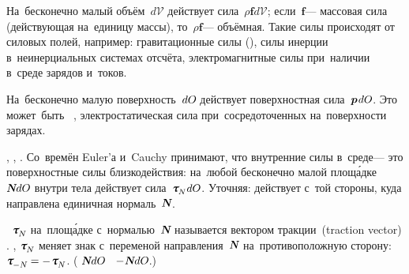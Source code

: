 \begin{otherlanguage}{russian}

На~бесконечно малый объём~$d\mathcal{V}$ действует сила~${\rho \bm{f} d\mathcal{V}}$; \hbox{если}~$\bm{f}$\:--- массовая сила (действующая на~единицу массы), то~${\rho \bm{f}}$\:--- объёмная. Такие силы происходят от силовых полей, например: гравитационные силы (), силы инерции в~неинерциальных системах отсчёта, электромагнитные силы при~наличии в~среде зарядов и~токов.

На~бесконечно малую поверхность~${dO\hspace{-0.12ex}}$ действует поверхностная сила~${\bm{p} \hspace{0.2ex} dO\hspace{-0.12ex}}$. Это может~быть  ~, электростатическая сила при~сосредоточенных на~поверхности зарядах.

, , .
Со~времён Euler’а и~Cauchy принимают, что внутренние силы в~среде\:--- это поверхностные силы близкодействия:
на~любой бесконечно малой площ\'{а}дке~${\mathboldN dO\hspace{-0.12ex}}$ внутри тела действует сила~${\tractionvector{N}\hspace{.16ex} dO\hspace{-0.12ex}}$.
Уточняя: действует с~той стороны, куда направлена единичная нормаль~$\mathboldN$.

~$\tractionvector{N}$ на~площ\'{а}дке с~нормалью~$\mathboldN$ называется вектором тракции~(traction vector)  .
, $\tractionvector{N}$ меняет знак с~переменой направления~$\mathboldN$ на~противоположную сторону:
${\tractionvector{-N} = - \hspace{.2ex} \tractionvector{N}}$.
(        ${\mathboldN dO\hspace{-0.12ex}}$ ~${- \hspace{.1ex} \mathboldN dO\hspace{-0.12ex}}$.)


\end{otherlanguage}
